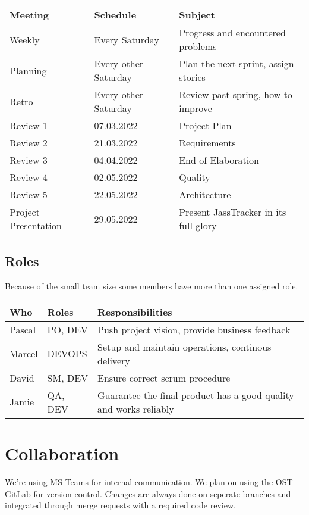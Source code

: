 \begin{table}[H]
    \begin{tabular}{l|l|l}
    \textbf{Meeting} & \textbf{Schedule} & \textbf{Subject} \\
    \hline
    Weekly & Every Saturday & Progress and encountered problems \\
    Planning & Every other Saturday & Plan the next sprint, assign stories \\
    Retro & Every other Saturday & Review past spring, how to improve \\
    Review 1 & 07.03.2022 & Project Plan \\
    Review 2 & 21.03.2022 & Requirements \\
    Review 3 & 04.04.2022 & End of Elaboration \\
    Review 4 & 02.05.2022 & Quality \\
    Review 5 & 22.05.2022 & Architecture \\
    Project Presentation & 29.05.2022 & Present JassTracker in its full glory
    \end{tabular}
\end{table}

\subsection*{Roles}

Because of the small team size some members have more than one assigned role.

\begin{table}[H]
    \begin{tabular}{l|l|l}
    \textbf{Who} & \textbf{Roles} & \textbf{Responsibilities} \\
    \hline
    Pascal & PO, DEV & Push project vision, provide business feedback \\
    Marcel & DEVOPS & Setup and maintain operations, continous delivery \\
    David  & SM, DEV & Ensure correct scrum procedure \\
    Jamie  & QA, DEV & Guarantee the final product has a good quality and works reliably
    \end{tabular}
\end{table}

\section{Collaboration}

We're using MS Teams for internal communication.
We plan on using the \href{https://gitlab.ost.ch/SEProj/2022-FS/g02-jasstracker/jasstracker}{OST GitLab} for version control.
Changes are always done on seperate branches and integrated through merge requests with a required code review.

